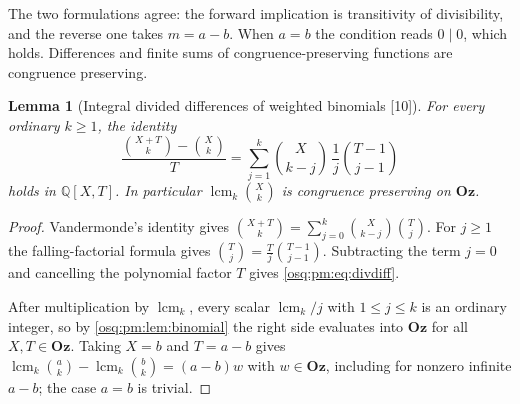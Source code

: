 \documentclass[11pt,letterpaper]{article}
\numberwithin{equation}{section}
\newtheorem{lemma}[lemma]{Lemma}
\theoremstyle{definition}
\theoremstyle{remark}
\theoremstyle{plain}
\newcommand{\Oz}{\mathbf{Oz}}
\newcommand{\Q}{\mathbb Q}
\newcommand{\lcm}{\operatorname{lcm}}
\newcommand{\src}[1]{\textup{\textsf{[#1]}}}
\begin{document}
The two formulations agree: the forward implication is transitivity of divisibility, and
the reverse one takes $m=a-b$. When $a=b$ the condition reads $0\mid0$, which holds.
Differences and finite sums of congruence-preserving functions are congruence preserving.

\begin{lemma}[Integral divided differences of weighted binomials \src{10}]
\label{osq:pm:lem:divdiff}
For every ordinary $k\ge1$, the identity
\begin{equation}\label{osq:pm:eq:divdiff}
 \frac{\binom{X+T}{k}-\binom Xk}{T}
   =\sum_{j=1}^k\binom X{k-j}\,\frac1j\binom{T-1}{j-1}
\end{equation}
holds in $\Q[X,T]$. In particular $\lcm_k\binom Xk$ is congruence preserving on $\Oz$.
\end{lemma}
\begin{proof}
Vandermonde's identity gives $\binom{X+T}k=\sum_{j=0}^k\binom X{k-j}\binom Tj$. For
$j\ge1$ the falling-factorial formula gives $\binom Tj=\frac Tj\binom{T-1}{j-1}$.
Subtracting the term $j=0$ and cancelling the polynomial factor $T$ gives
\eqref{osq:pm:eq:divdiff}.

After multiplication by $\lcm_k$, every scalar $\lcm_k/j$ with $1\le j\le k$ is an
ordinary integer, so by \cref{osq:pm:lem:binomial} the right side evaluates into $\Oz$ for
all $X,T\in\Oz$. Taking $X=b$ and $T=a-b$ gives
$\lcm_k\binom ak-\lcm_k\binom bk=(a-b)w$ with $w\in\Oz$, including for nonzero infinite
$a-b$; the case $a=b$ is trivial.
\end{proof}
\end{document}
